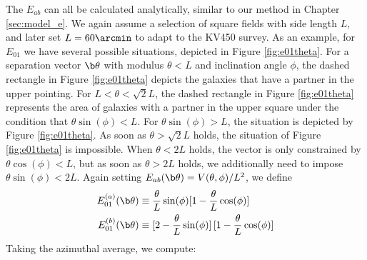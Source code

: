 The $E_{ab}$ can all be calculated analytically, similar to our method in Chapter \ref{sec:model_e}. We again assume a selection of square fields with side length $L$, and later set $L=60\arcmin$ to adapt to the KV450 survey. As an example, for $E_{01}$ we have several possible situations, depicted in Figure \ref{fig:e01theta}. For a separation vector $\b\theta$ with modulus $\theta<L$ and inclination angle $\phi$, the dashed rectangle in Figure \ref{fig:e01theta} depicts the galaxies that have a partner in the upper pointing. For $L<\theta<\sqrt{2}L$, the dashed rectangle in Figure \ref{fig:e01theta} represents the area of galaxies with a partner in the upper square under the condition that $\theta\sin(\phi)<L$. For $\theta\sin(\phi)>L$, the situation is depicted by Figure \ref{fig:e01theta}. As soon as $\theta>\sqrt{2}L$ holds, the situation of Figure \ref{fig:e01theta} is impossible. When $\theta<2L$ holds, the vector is only constrained by $\theta\cos(\phi)<L$, but as soon as $\theta >2L$ holds, we additionally need to impose $\theta\sin(\phi)<2L$. Again setting $E_{ab}(\b\theta) = V(\theta,\phi)/L^2$, we define \begin{align}
E_{01}^{(a)}(\b\theta) & \equiv \frac{\theta}{L}\sin(\phi)[1-\frac{\theta}{L}\cos(\phi)] \nonumber\\
E_{01}^{(b)}(\b\theta) & \equiv [2-\frac{\theta}{L}\sin(\phi)]\, [1-\frac{\theta}{L}\cos(\phi)]
\end{align}
Taking the azimuthal average, we compute:
